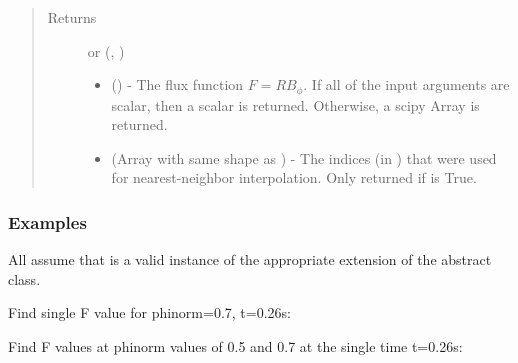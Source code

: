 \documentclass[letterpaper,10pt,english]{sphinxmanual}
\begin{document}
\begin{fulllineitems}
\begin{fulllineitems}
\begin{quote}
\begin{description}
\begin{itemize}
\end{itemize}

\item[{Returns}] \leavevmode

 or (, )
\begin{itemize}
\item {} 
 () - The flux function \(F=RB_{\phi}\).
If all of the input arguments are scalar, then a scalar is returned.
Otherwise, a scipy Array is returned.

\item {} 
 (Array with same shape as ) - The indices
(in ) that were used for
nearest-neighbor interpolation. Only returned if  is
True.

\end{itemize}


\end{description}\end{quote}
\subsubsection*{Examples}

All assume that  is a valid instance of the appropriate
extension of the {\hyperref[\detokenize{eqtools:eqtools.core.Equilibrium}]{}} abstract class.

Find single F value for phinorm=0.7, t=0.26s:

\begin{sphinxVerbatim}[commandchars=\\\{\}]
   
\end{sphinxVerbatim}

Find F values at phinorm values of 0.5 and 0.7 at the single time
t=0.26s:

\begin{sphinxVerbatim}[commandchars=\\\{\}]
  \PYG{p}{[} \PYG{p}{]} 
\end{sphinxVerbatim}


\end{fulllineitems}
\end{fulllineitems}
\end{document}
